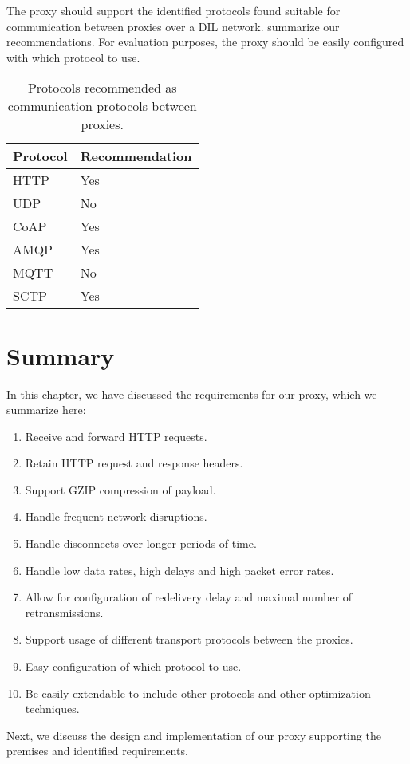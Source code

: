The proxy should support the identified protocols found suitable for
communication between proxies over a DIL network.
 summarize our recommendations. For
evaluation purposes, the proxy should be easily configured with which protocol
to use.

\begin{table}[h]
\begin{tabularx}{\textwidth}{| X | X |}
\hline
  \textbf{Protocol} & \textbf{Recommendation} \\ \hline
  HTTP & Yes \\ \hline
  UDP & No \\ \hline
  CoAP & Yes \\ \hline
  AMQP & Yes \\ \hline
  MQTT & No \\ \hline
  SCTP & Yes \\ \hline
\end{tabularx}
\caption{Protocols recommended as communication protocols between proxies.}
\label{table:possible-proxy-protocols}
\end{table}



\section{Summary}
\label{section:requirements-summary}

In this chapter, we have discussed the requirements for our proxy, which we
summarize here:

\begin{enumerate}
    \item Receive and forward HTTP requests.
    \item Retain HTTP request and response headers.
    \item Support GZIP compression of payload.
    \item Handle frequent network disruptions.
    \item Handle disconnects over longer periods of time.
    \item Handle low data rates, high delays and high packet error rates.
    \item Allow for configuration of redelivery delay and maximal number of retransmissions.
    \item Support usage of different transport protocols between the proxies.
    \item Easy configuration of which protocol to use.
    \item Be easily extendable to include other protocols and other optimization techniques.
\end{enumerate}

Next, we discuss the design and implementation of our proxy supporting the
premises and identified requirements.
